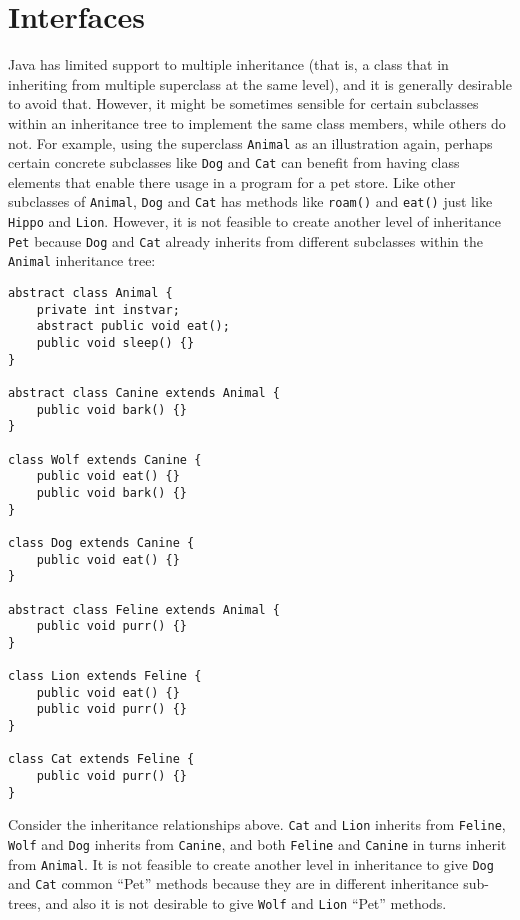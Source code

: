 \documentclass{tufte-handout}
\begin{document}
    \section*{Interfaces}
    Java has limited support to multiple inheritance (that is, a class that in inheriting from multiple superclass at the same level), and it is generally desirable to avoid that. However, it might be sometimes sensible for certain subclasses within an inheritance tree to implement the same class members, while others do not. For example, using the superclass \texttt{Animal} as an illustration again, perhaps certain concrete subclasses like \texttt{Dog} and \texttt{Cat} can benefit from having class elements that enable there usage in a program for a pet store. Like other subclasses of \texttt{Animal}, \texttt{Dog} and \texttt{Cat} has methods like \texttt{roam()} and \texttt{eat()} just like \texttt{Hippo} and \texttt{Lion}. However, it is not feasible to create another level of inheritance \texttt{Pet} because \texttt{Dog} and \texttt{Cat} already inherits from different subclasses within the \texttt{Animal} inheritance tree:

    \begin{lstlisting}
abstract class Animal {
    private int instvar;
    abstract public void eat();
    public void sleep() {}
}

abstract class Canine extends Animal {
    public void bark() {}
}

class Wolf extends Canine {
    public void eat() {}
    public void bark() {}
}

class Dog extends Canine {
    public void eat() {}
}

abstract class Feline extends Animal {
    public void purr() {}
}

class Lion extends Feline {
    public void eat() {}
    public void purr() {}
}

class Cat extends Feline {
    public void purr() {}
}
    \end{lstlisting}

    Consider the inheritance relationships above. \texttt{Cat} and \texttt{Lion} inherits from \texttt{Feline}, \texttt{Wolf} and \texttt{Dog} inherits from \texttt{Canine}, and both \texttt{Feline} and \texttt{Canine} in turns inherit from \texttt{Animal}. It is not feasible to create another level in inheritance to give \texttt{Dog} and \texttt{Cat} common ``Pet'' methods because they are in different inheritance sub-trees, and also it is not desirable to give \texttt{Wolf} and \texttt{Lion} ``Pet'' methods. 
\end{document}
